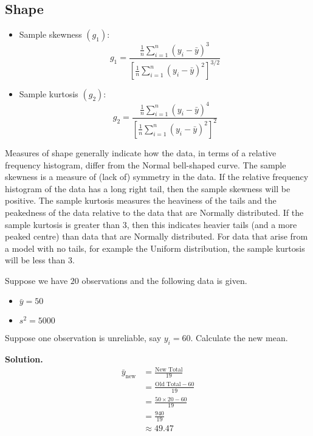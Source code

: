 \subsection*{Shape}
\begin{itemize}
    \item Sample skewness $ (g_1) $:
          \[g_{1}=\frac{\frac{1}{n}
                  \sum_{i=1}^{n}\left(y_{i}-\bar{y}\right)^{3}}{\left[\frac{1}{n} \sum_{i=1}^{n}\left(y_{i}-\bar{y}\right)^{2}\right]^{3 / 2}}\]
    \item Sample kurtosis $ (g_2) $:
          \[g_{2}=\frac{\frac{1}{n} \sum_{i=1}^{n}\left(y_{i}-\bar{y}\right)^{4}}{\left[\frac{1}{n} \sum_{i=1}^{n}\left(y_{i}-\bar{y}\right)^{2}\right]^{2}}\]
\end{itemize}
Measures of shape generally indicate how the data, in terms of a relative frequency
histogram, differ from the Normal bell-shaped curve. The sample skewness is a measure
of (lack of) symmetry in the data. If the relative frequency histogram
of the data has a long right tail, then the sample skewness will be positive.
The sample kurtosis measures the heaviness of the tails and the peakedness of the data
relative to the data that are Normally distributed. If the sample kurtosis is greater than 3,
then this indicates heavier tails (and a more peaked centre) than data that are Normally distributed.
For data that arise from a model with no tails, for example the Uniform distribution, the sample
kurtosis will be less than 3.


\begin{Example}{}{}
    Suppose we have $ 20 $ observations and the following data is given.
    \begin{itemize}
        \item $ \bar{y}=50 $
        \item $ s^2=5000 $
    \end{itemize}
    Suppose one observation is unreliable, say $ y_i=60 $. Calculate
    the new mean.

    \textbf{Solution.}
    \begin{align*}
        \bar{y}_{\text{new}}
         & =\frac{\text{New Total}}{19}    \\
         & =\frac{\text{Old Total}-60}{19} \\
         & =\frac{50\times 20-60}{19}      \\
         & =\frac{940}{19}                 \\
         & \approx 49.47
    \end{align*}
\end{Example}


